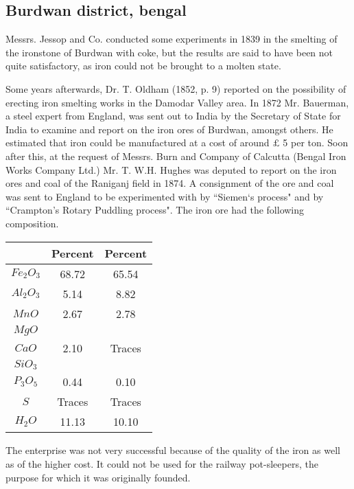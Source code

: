 \vspace{-.3cm}

\subsection*{Burdwan district, bengal}

\vspace{-.2cm}

Messrs. Jessop and Co. conducted some experiments in 1839 in the smelting of the ironstone of Burdwan with coke, but the results are said to have been not quite satisfactory, as iron could not be brought to a molten state. 

Some years afterwards, Dr. T. Oldham (1852, p. 9) reported on the possibility of erecting iron smelting works in the Damodar Valley area. In 1872 Mr. Bauerman, a steel expert from England, was sent out to India by the Secretary of State for India to examine and report on the iron ores of Burdwan, amongst others. He estimated that iron could be manufactured at a cost of around $£$ 5 per ton.  Soon after this, at the request of Messrs. Burn and Company of Calcutta (Bengal Iron Works Company Ltd.) Mr. T. W.H. Hughes was deputed to report on the iron ores and coal of the Raniganj field in 1874.  A consignment of the ore and coal was sent to England to be experimented with by ``Siemen`s process" and by ``Crampton's Rotary Puddling process".  The iron ore had the following composition.
{\fontsize{8}{10}\selectfont
\begin{center}
\begin{tabular}{|c|c|c|}
\hline
 & Percent & Percent\\\hline
$Fe_2O_3$ & 68.72 & 65.54\\ \hline
$Al_2O_3$ & 5.14 & 8.82\\ \hline
$MnO$ & 2.67 & 2.78\\ \hline
$MgO$ & & \\
$CaO$ & 2.10 & Traces\\ 
$SiO_3$ & & \\ \hline
$P_3O_5$ & 0.44 & 0.10\\ \hline
$S$ & Traces & Traces \\ \hline
$H_2O$ & 11.13 & 10.10\\ \hline
\end{tabular}
\end{center}
}

The enterprise was not very successful because of the quality of the iron as well as of the higher cost.  It could not be used for the railway pot-sleepers, the purpose for which it was originally founded.

